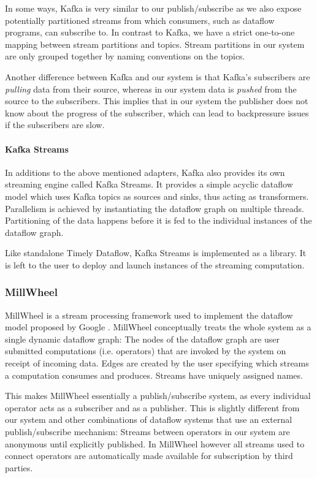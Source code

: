 In some ways, Kafka is very similar to our publish/subscribe as we also expose
potentially partitioned streams from which consumers, such as dataflow programs,
can subscribe to. In contrast to Kafka, we have a strict one-to-one mapping between stream
partitions and topics. Stream partitions in our system are only grouped together
by naming conventions on the topics.
 
Another difference between Kafka and our system is that Kafka's subscribers are
\emph{pulling} data from their source, whereas in our system data is \emph{pushed}
from the source to the subscribers. This implies that in our system the publisher
does not know about the progress of the subscriber, which can lead
to backpressure issues if the subscribers are slow.

\paragraph{Kafka Streams}
In additions to the above mentioned adapters, Kafka also provides its own
streaming engine called Kafka Streams. It provides a simple acyclic dataflow
model which uses Kafka topics as sources and sinks, thus acting as transformers.
Parallelism is achieved by instantiating the dataflow graph on multiple threads.
Partitioning of the data happens before it is fed to the individual instances
of the dataflow graph.

Like standalone Timely Dataflow, Kafka Streams is implemented as a library. It
is left to the user to deploy and launch instances of the streaming computation.

\subsubsection{MillWheel}

MillWheel \cite{millwheel} is a stream processing framework used to implement
the dataflow model proposed by Google \cite{google}. MillWheel conceptually
treats the whole system as a single dynamic dataflow graph: The nodes of the
dataflow graph are user submitted computations (i.e. operators) that are
invoked by the system on receipt of incoming data. Edges are created by the
user specifying which streams a computation consumes and produces. Streams
have uniquely assigned names.

This makes MillWheel essentially a publish/subscribe system, as every individual
operator acts as a subscriber and as a publisher. This is slightly different from
our system and other combinations of dataflow systems that use an external
publish/subscribe mechanism: Streams between operators in our system are anonymous until
explicitly published. In MillWheel however all streams used to connect operators
are automatically made available for subscription by third parties.

